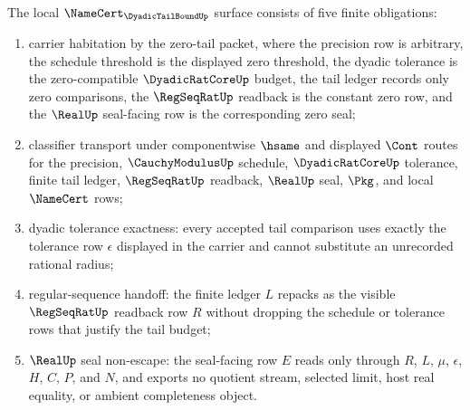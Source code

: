 \begin{theorem}
\label{thm:dyadic-tail-bound-namecert-obligations}
The local $\NameCert_{\DyadicTailBoundUp}$ surface consists of five finite obligations:
\begin{enumerate}
\item carrier habitation by the zero-tail packet, where the precision row is arbitrary, the schedule threshold is the displayed zero threshold, the dyadic tolerance is the zero-compatible $\DyadicRatCoreUp$ budget, the tail ledger records only zero comparisons, the $\RegSeqRatUp$ readback is the constant zero row, and the $\RealUp$ seal-facing row is the corresponding zero seal;
\item classifier transport under componentwise $\hsame$ and displayed $\Cont$ routes for the precision, $\CauchyModulusUp$ schedule, $\DyadicRatCoreUp$ tolerance, finite tail ledger, $\RegSeqRatUp$ readback, $\RealUp$ seal, $\Pkg$, and local $\NameCert$ rows;
\item dyadic tolerance exactness: every accepted tail comparison uses exactly the tolerance row $\epsilon$ displayed in the carrier and cannot substitute an unrecorded rational radius;
\item regular-sequence handoff: the finite ledger $L$ repacks as the visible $\RegSeqRatUp$ readback row $R$ without dropping the schedule or tolerance rows that justify the tail budget;
\item $\RealUp$ seal non-escape: the seal-facing row $E$ reads only through $R$, $L$, $\mu$, $\epsilon$, $H$, $C$, $P$, and $N$, and exports no quotient stream, selected limit, host real equality, or ambient completeness object.
\end{enumerate}
\end{theorem}

